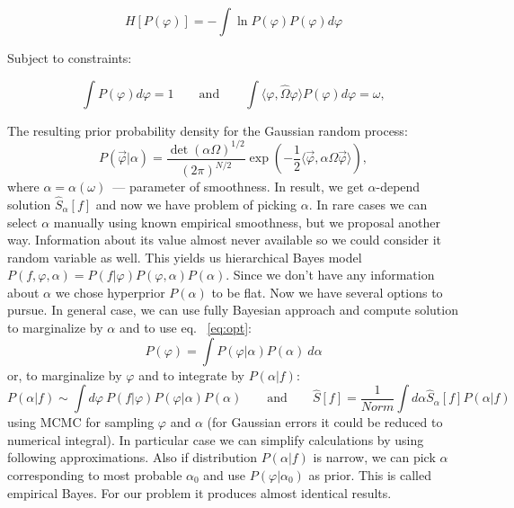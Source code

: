 \documentclass{webofc}
\begin{document}
\begin{equation*}
  H[P(\varphi)] = -\int \ln{P(\varphi)} P(\varphi) d\varphi
\end{equation*}

Subject to constraints:

\begin{equation}
  \int P(\varphi) d\varphi = 1
  \qquad\mbox{and}\qquad
  \int \langle \varphi,\hat{\Omega}\varphi \rangle P(\varphi) d\varphi = \omega,  
  \label{eq-smoothness}
\end{equation}

The resulting prior probability density for the Gaussian random process:
\begin{equation}
  P(\vec{\varphi}|\alpha) = \frac{\det(\alpha\Omega)^{1/2}}{(2\pi)^{N/2}} 
  \exp\left(-\frac{1}{2}\langle\vec{\varphi},\alpha\Omega\vec{\varphi}\rangle\right),
  \label{eq-prior}
\end{equation}
where $\alpha = \alpha(\omega)$~--- parameter of smoothness. In result, we get $\alpha$-depend solution $\hat{S}_{\alpha}[f]$ and now we have problem of picking $\alpha$. In rare cases we can select $\alpha$ manually using known empirical smoothness, but we proposal another way. Information about its value almost never available so we could consider it random variable as well. This yields us hierarchical Bayes model $P(f,\varphi,\alpha) = P(f|\varphi)P(\varphi,\alpha)P(\alpha)$.
Since we don't have any information about $\alpha$ we chose hyperprior $P(\alpha)$ to be flat. Now we have several options to pursue. In general case, we can use fully Bayesian approach  and compute solution to marginalize by $\alpha$ and to use eq. ~\ref{eq:opt}:
    \begin{equation}\label{eq:varAposteriorAlpha}
    P(\varphi) = \int P(\varphi|\alpha) P(\alpha)~d\alpha 
    \end{equation}
or,  to marginalize by $\varphi$ and to integrate by $P(\alpha|f)$:
    \begin{equation}
    P(\alpha|f) \sim \int d\varphi~P(f|\varphi)P(\varphi|\alpha)P(\alpha)
    \qquad\mbox{and}\qquad
    \hat{S}[f] =\frac{1}{Norm} \int d\alpha \hat{S}_{\alpha}[f] P(\alpha|f)
    \label{eq:solveAposteriorAlpha}
    \end{equation}
    using MCMC for sampling $\varphi$ and $\alpha$ (for Gaussian errors it could be reduced to numerical integral). In particular case we can simplify calculations by using following approximations. Also if distribution $P(\alpha|f)$ is narrow, we can pick $\alpha$ corresponding to most probable $\alpha_0$ and use $P(\varphi|\alpha_0)$ as prior. This is called empirical Bayes. For our problem it produces almost identical results.
    
\end{document}
